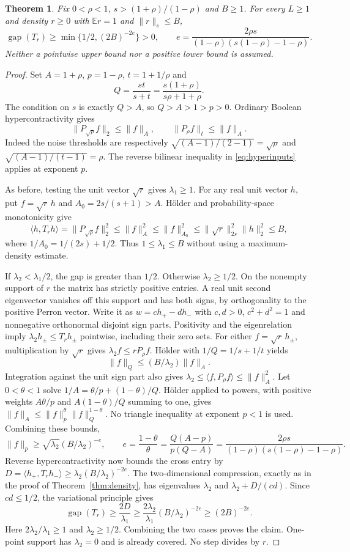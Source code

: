 \documentclass[11pt]{article}
\newtheorem{theorem}{Theorem}
\newcommand{\gap}{\operatorname{gap}}
\begin{document}
\begin{theorem}\label{thm:moment}
Fix $0<\rho<1$, $s>(1+\rho)/(1-\rho)$ and $B\ge1$. For every $L\ge1$
and density $r\ge0$ with $\mathbb E r=1$ and $\|r\|_s\le B$,
\[
 \gap(T_r)\ge\min\{1/2,(2B)^{-2e}\}>0,
 \qquad e=\frac{2\rho s}{(1-\rho)(s(1-\rho)-1-\rho)}.
\]
Neither a pointwise upper bound nor a positive lower bound is assumed.
\end{theorem}
\begin{proof}
Set $A=1+\rho$, $p=1-\rho$, $t=1+1/\rho$ and
\[
 Q=\frac{st}{s+t}=\frac{s(1+\rho)}{s\rho+1+\rho}.
\]
The condition on $s$ is exactly $Q>A$, so $Q>A>1>p>0$.
Ordinary Boolean hypercontractivity gives
\[
 \|P_{\sqrt\rho}f\|_2\le\|f\|_A,
 \qquad \|P_\rho f\|_t\le\|f\|_A.
\]
Indeed the noise thresholds are respectively
$\sqrt{(A-1)/(2-1)}=\sqrt\rho$ and
$\sqrt{(A-1)/(t-1)}=\rho$. The reverse bilinear inequality in
\eqref{eq:hyperinputs} applies at exponent $p$.

As before, testing the unit vector $\sqrt r$ gives $\lambda_1\ge1$.
For any real unit vector $h$, put $f=\sqrt r\,h$ and
$A_0=2s/(s+1)>A$. H\"older and probability-space monotonicity give
\[
 \langle h,T_rh\rangle=\|P_{\sqrt\rho}f\|_2^2
 \le\|f\|_A^2\le\|f\|_{A_0}^2
 \le\|\sqrt r\|_{2s}^2\|h\|_2^2\le B,
\]
where $1/A_0=1/(2s)+1/2$. Thus $1\le\lambda_1\le B$ without
using a maximum-density estimate.

If $\lambda_2<\lambda_1/2$, the gap is greater than $1/2$.
Otherwise $\lambda_2\ge1/2$. On the nonempty support of $r$ the matrix
has strictly positive entries. A real unit second eigenvector vanishes
off this support and has both signs, by orthogonality to the positive
Perron vector. Write it as $w=c h_+-d h_-$ with $c,d>0$,
$c^2+d^2=1$ and nonnegative orthonormal disjoint sign parts.
Positivity and the eigenrelation imply
$\lambda_2h_\pm\le T_rh_\pm$ pointwise, including their zero sets.
For either $f=\sqrt r\,h_\pm$, multiplication by $\sqrt r$ gives
$\lambda_2f\le rP_\rho f$. H\"older with $1/Q=1/s+1/t$ yields
\[
 \|f\|_Q\le (B/\lambda_2)\|f\|_A.
\]
Integration against the unit sign part also gives
$\lambda_2\le\langle f,P_\rho f\rangle\le\|f\|_A^2$.
Let $0<\theta<1$ solve $1/A=\theta/p+(1-\theta)/Q$.
H\"older applied to powers, with positive weights
$A\theta/p$ and $A(1-\theta)/Q$ summing to one, gives
$\|f\|_A\le\|f\|_p^\theta\|f\|_Q^{1-\theta}$.
No triangle inequality at exponent $p<1$ is used. Combining these bounds,
\[
 \|f\|_p\ge\sqrt{\lambda_2}(B/\lambda_2)^{-e},\qquad
 e=\frac{1-\theta}{\theta}
   =\frac{Q(A-p)}{p(Q-A)}
   =\frac{2\rho s}{(1-\rho)(s(1-\rho)-1-\rho)}.
\]
Reverse hypercontractivity now bounds the cross entry by
$D=\langle h_+,T_rh_-\rangle\ge\lambda_2(B/\lambda_2)^{-2e}$.
The two-dimensional compression, exactly as in the proof of
Theorem~\ref{thm:density}, has eigenvalues $\lambda_2$ and
$\lambda_2+D/(cd)$. Since $cd\le1/2$, the variational principle gives
\[
 \gap(T_r)\ge\frac{2D}{\lambda_1}
 \ge\frac{2\lambda_2}{\lambda_1}(B/\lambda_2)^{-2e}
 \ge(2B)^{-2e}.
\]
Here $2\lambda_2/\lambda_1\ge1$ and $\lambda_2\ge1/2$.
Combining the two cases proves the claim. One-point support has
$\lambda_2=0$ and is already covered. No step divides by $r$.
\end{proof}
\end{document}
